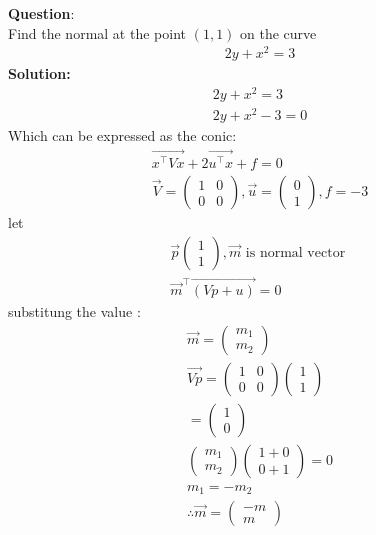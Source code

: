 \documentclass[journal]{IEEEtran}
\begin{document}
\textbf{Question}:\\
Find the normal at the point $(1,1)$ on the curve
\begin{align}
2y + x^2 = 3
\end{align}
\textbf{Solution:}
\begin{align}
    2y + x^2 = 3\\
    2y + x^2 -3 = 0
\end{align}
Which can be expressed as the conic:
\begin{align}
\vec{x^\top V x} + 2\vec{u^\top x} + f = 0\\
\vec{V} = \begin{pmatrix}1 & 0 \\0 & 0\end{pmatrix}, \vec{u} = \begin{pmatrix}0 \\1\end{pmatrix}, f = -3
\end{align}
let 
\begin{align}
\vec{p} \begin{pmatrix} 1 \\ 1 \end{pmatrix} , \vec{m} \text{ is normal vector }\\
\vec{m}^\top \vec{(Vp + u)} = 0
\end{align}
substitung the value :
\begin{align}
\vec{m}=\begin{pmatrix} m_1 \\ m_2 \end{pmatrix} \\
\vec{Vp}=\begin{pmatrix}1 & 0 \\0 & 0\end{pmatrix}\begin{pmatrix}
    1\\1 \end{pmatrix}\\
    =\begin{pmatrix} 1\\0 \end{pmatrix}\\
\begin{pmatrix} m_1 \\ m_2 \end{pmatrix} \begin{pmatrix} 1+0\\0+1 \end{pmatrix}=0\\
m_1=-m_2\\
\therefore \vec{m}=\begin{pmatrix} -m \\ m \end{pmatrix}
\end{align}
\end{document}
